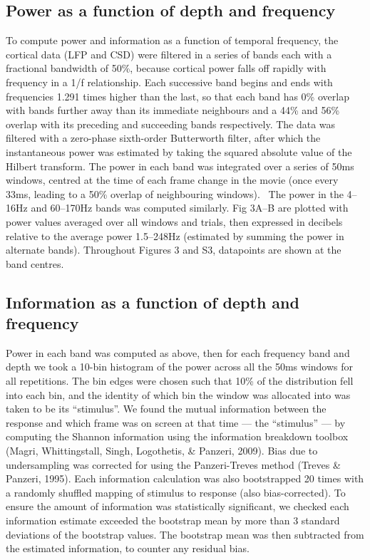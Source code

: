 \documentclass{article}
\begin{document}
\bigskip

\subsection[Power as a function of depth and frequency]{Power as a function of depth and frequency}
To compute power and information as a function of temporal frequency, the cortical data (LFP and CSD) were filtered in a series of bands each with a fractional bandwidth of 50\%, because cortical power falls off rapidly with frequency in a 1/f relationship. Each successive band begins and ends with frequencies 1.291 times higher than the last, so that each band has 0\% overlap with bands further away than its immediate neighbours and a 44\% and 56\% overlap with its preceding and succeeding bands respectively. The data was filtered with a zero-phase sixth-order Butterworth filter, after which the instantaneous power was estimated by taking the squared absolute value of the Hilbert transform. The power in each band was integrated over a series of 50ms windows, centred at the time of each frame change in the movie (once every 33ms, leading to a 50\% overlap of neighbouring windows). \ The power in the 4--16Hz and 60--170Hz bands was computed similarly. Fig 3A--B are plotted with power values averaged over all windows and trials, then expressed in decibels relative to the average power 1.5--248Hz (estimated by summing the power in alternate bands). Throughout Figures 3 and S3, datapoints are shown at the band centres.

\subsection{Information as a function of depth and frequency}
Power in each band was computed as above, then for each frequency band and depth we took a 10-bin histogram of the power across all the 50ms windows for all repetitions. The bin edges were chosen such that 10\% of the distribution fell into each bin, and the identity of which bin the window was allocated into was taken to be its ``stimulus''. We found the mutual information between the response and which frame was on screen at that time --- the ``stimulus'' --- by computing the Shannon information using the information breakdown toolbox (Magri, Whittingstall, Singh, Logothetis, \& Panzeri, 2009). Bias due to undersampling was corrected for using the Panzeri-Treves method (Treves \& Panzeri, 1995). Each information calculation was also bootstrapped 20 times with a randomly shuffled mapping of stimulus to response (also bias-corrected). To ensure the amount of information was statistically significant, we checked each information estimate exceeded the bootstrap mean by more than 3 standard deviations of the bootstrap values. The bootstrap mean was then subtracted from the estimated information, to counter any residual bias.
\end{document}
